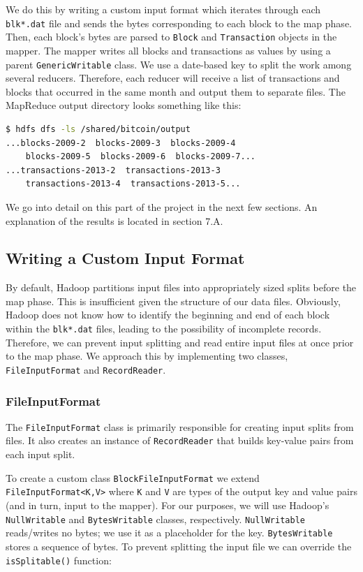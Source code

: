 \documentclass[9pt,twocolumn,twoside]{idsi}
\begin{document}
We do this by writing a custom input format which iterates through each \lstinline{blk*.dat} file and sends the bytes corresponding to each block to the map phase. Then, each block's bytes are parsed to \lstinline{Block} and \lstinline{Transaction} objects in the mapper. The mapper writes all blocks and transactions as values by using a parent \lstinline{GenericWritable} class. We use a date-based key to split the work among several reducers. Therefore, each reducer will receive a list of transactions and blocks that occurred in the same month and output them to separate files. The MapReduce output directory looks something like this:

\begin{lstlisting}[language=bash]
 $ hdfs dfs -ls /shared/bitcoin/output
...blocks-2009-2  blocks-2009-3  blocks-2009-4
    blocks-2009-5  blocks-2009-6  blocks-2009-7...
...transactions-2013-2  transactions-2013-3
    transactions-2013-4  transactions-2013-5...
\end{lstlisting}

We go into detail on this part of the project in the next few sections. An explanation of the results is located in section 7.A.

\subsection{Writing a Custom Input Format}
By default, Hadoop partitions input files into appropriately sized splits before the map phase. This is insufficient given the structure of our data files. Obviously, Hadoop does not know how to identify the beginning and end of each block within the \lstinline{blk*.dat} files, leading to the possibility of incomplete records. Therefore, we can prevent input splitting and read entire input files at once prior to the map phase. We approach this by implementing two classes, \lstinline{FileInputFormat} and \lstinline{RecordReader}.

\subsubsection{FileInputFormat}
The \lstinline{FileInputFormat} class is primarily responsible for creating input splits from files. It also creates an instance of \lstinline{RecordReader} that builds key-value pairs from each input split.

To create a custom class \lstinline{BlockFileInputFormat} we extend \lstinline{FileInputFormat<K,V>} where \lstinline{K} and \lstinline{V} are types of the output key and value pairs (and in turn, input to the mapper). For our purposes, we will use Hadoop's \lstinline{NullWritable} and \lstinline{BytesWritable} classes, respectively. \lstinline{NullWritable} reads/writes no bytes; we use it as a placeholder for the key. \lstinline{BytesWritable} stores a sequence of bytes. To prevent splitting the input file we can override the \lstinline{isSplitable()} function:
\end{document}
